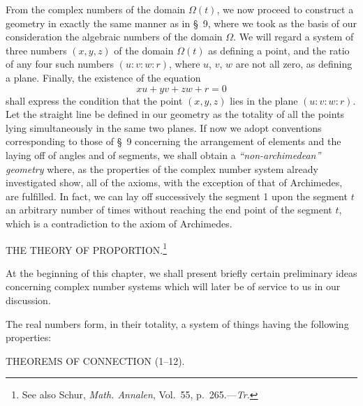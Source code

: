 \documentclass[11pt,oneside]{book}
\begin{document}
From the complex numbers of the domain $\Omega (t)$,
we now proceed to construct a geometry in exactly
the same manner as in \S~9, where we took as the basis
of our consideration the algebraic numbers of the domain
$\Omega$. We will regard a system of three numbers
$(x,y,z)$ of the domain $\Omega (t)$ as defining a point, and
the ratio of any four such numbers $(u:v:w:r)$, where
$u$, $v$, $w$ are not all zero, as defining a plane. Finally,
the existence of the equation
\[
xu + yv + zw + r = 0
\]
shall express the condition that the point $(x, y, z)$ lies
in the plane $(u:v:w:r)$. Let the straight line be defined
in our geometry as the totality of all the points
lying simultaneously in the same two planes. If now
we adopt conventions corresponding to those of \S~9
concerning the arrangement of elements and the laying
off of angles and of segments, we shall obtain a
\emph{``non-archimedean'' geometry} where, as the properties
of the complex number system already investigated
show, all of the axioms, with the exception of that of
Archimedes, are fulfilled. In fact, we can lay off successively
the segment 1 upon the segment $t$ an arbitrary
number of times without reaching the end point
of the segment $t$, which is a contradiction to the axiom
of Archimedes.
\newpage
\label{folio37}
\begin{center}{\Large THE THEORY OF PROPORTION.\footnote{See
also Schur, \emph{Math. Annalen}, Vol.~55, p.~265.---\emph{Tr.}}}\end{center}
\label{p13}

At the beginning of this chapter, we shall present
briefly certain preliminary ideas concerning complex
number systems which will later be of service to
us in our discussion.

The real numbers form, in their totality, a system
of things having the following properties:

\begin{center}
THEOREMS OF CONNECTION (1--12).
\end{center}
\end{document}
